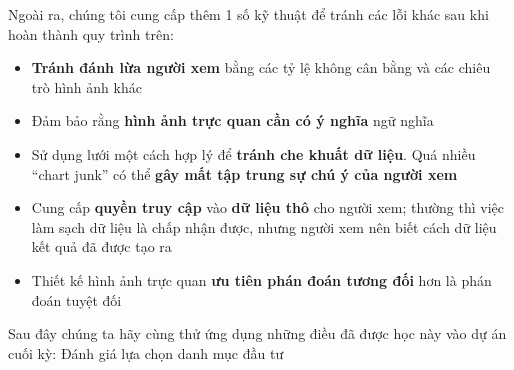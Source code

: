 Ngoài ra, chúng tôi cung cấp thêm 1 số kỹ thuật để tránh các lỗi khác
sau khi hoàn thành quy trình trên:

\begin{itemize}
\tightlist
\item
  \textbf{Tránh đánh lừa người xem} bằng các tỷ lệ không cân bằng và các
  chiêu trò hình ảnh khác
\item
  Đảm bảo rằng \textbf{hình ảnh trực quan cần có ý nghĩa} ngữ nghĩa
\item
  Sử dụng lưới một cách hợp lý để \textbf{tránh che khuất dữ liệu}. Quá
  nhiều ``chart junk'' có thể \textbf{gây mất tập trung sự chú ý của
  người xem}
\item
  Cung cấp \textbf{quyền truy cập} vào \textbf{dữ liệu thô} cho người
  xem; thường thì việc làm sạch dữ liệu là chấp nhận được, nhưng người
  xem nên biết cách dữ liệu kết quả đã được tạo ra
\item
  Thiết kế hình ảnh trực quan \textbf{ưu tiên phán đoán tương đối} hơn
  là phán đoán tuyệt đối
\end{itemize}

Sau đây chúng ta hãy cùng thử ứng dụng những điều đã được học này vào dự
án cuối kỳ: Đánh giá lựa chọn danh mục đầu tư
